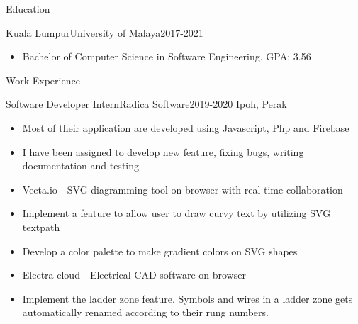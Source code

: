 \documentclass[]{mcdowellcv}
\begin{document}
\makeheader


\begin{cvsection}{Education}
	\begin{cvsubsection}{Kuala Lumpur}{University of Malaya}{2017-2021}
		\begin{itemize}
			\item Bachelor of Computer Science in Software Engineering. GPA: 3.56
		\end{itemize}
	\end{cvsubsection}
\end{cvsection}
\begin{cvsection}{Work Experience}
	\begin{cvsubsection}{Software Developer Intern}{Radica Software}{2019-2020}
		Ipoh, Perak
		\begin{itemize}%
			\item Most of their application are developed using Javascript, Php and Firebase
			\item I have been assigned to develop new feature, fixing bugs, writing documentation and testing
			\item Vecta.io - SVG diagramming tool on browser with real time collaboration
			\item Implement a feature to allow user to draw curvy text by utilizing SVG textpath
			\item Develop a color palette to make gradient colors on SVG shapes
			\item Electra cloud - Electrical CAD software on browser
			\item Implement the ladder zone feature. Symbols and wires in a ladder zone gets automatically renamed according to their rung numbers.
		\end{itemize}
	\end{cvsubsection}
\end{cvsection}
\end{document}
